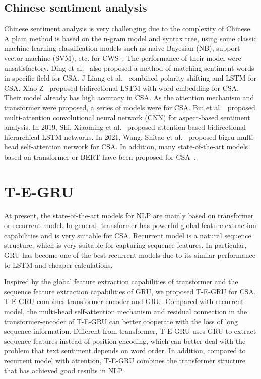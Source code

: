 \subsection{Chinese sentiment analysis}
Chinese sentiment analysis is very challenging due to the complexity of Chinese. A plain method is based on the n-gram model and syntax tree, using some classic machine learning classification models such as naive Bayesian (NB), support vector machine (SVM), etc. for CWS~\cite{zou2015sentiment}. The performance of their model were unsatisfactory. Ding et al.~\cite{ding2008holistic} also proposed a method of matching sentiment words in specific field for CSA. J Liang et al.~\cite{liang2015polarity} combined polarity shifting and LSTM for CSA. Xiao Z~\cite{xiao2016chinese} proposed bidirectional LSTM with word embedding for CSA. Their model already has high accuracy in CSA. As the attention mechanism and transformer were proposed, a series of models were  for CSA. Bin et al.~\cite{bin2017aspect} proposed multi-attention convolutional neural network (CNN) for aspect-based sentiment analysis. In 2019, Shi, Xiaoming et al.~\cite{shi2019attention} proposed attention-based bidirectional hierarchical LSTM networks. In 2021, Wang, Shitao et al.~\cite{wang2021bigru} proposed bigru-multi-head self-attention network for CSA. In addition, many state-of-the-art models based on transformer or BERT have been proposed for CSA~\cite{tang2021chinese,zhu2019transformer,gao2021chinese}.

\section{T-E-GRU}
At present, the state-of-the-art models for NLP are mainly based on transformer or recurrent model. In general, transformer has powerful global feature extraction capabilities and is very suitable for CSA. Recurrent model is a natural sequence structure, which is very suitable for capturing sequence features. In particular, GRU has become one of the best recurrent models due to its similar performance to LSTM and cheaper calculations.

Inspired by the global feature extraction capabilities of transformer and the sequence feature extraction capabilities of GRU, we proposed T-E-GRU for CSA. T-E-GRU combines transformer-encoder and GRU. Compared with recurrent model, the multi-head self-attention mechanism and residual connection in the transformer-encoder of T-E-GRU can better cooperate with the loss of long sequence information. Different from transformer, T-E-GRU uses GRU to extract sequence features instead of position encoding, which can better deal with the problem that text sentiment depends on word order. In addition, compared to recurrent model with attention, T-E-GRU combines the transformer structure that has achieved good results in NLP.


